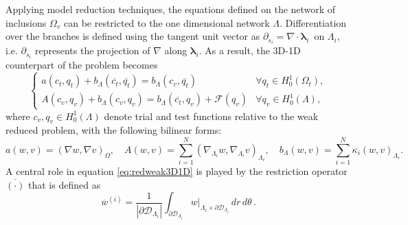 \documentclass[10pt]{article} %
\def\bct{\overline{c_t}}
\def\bqt{\overline{q_t}}
\begin{document}
	Applying model reduction techniques, the equations defined on the network of inclusions $\Omega_v$ can be restricted to the one dimensional network $\Lambda$. Differentiation over the branches is defined using the tangent unit vector as ${\partial_{s_i}} = \nabla \cdot \pmb{\lambda}_i\,$ on $ \Lambda_i$, i.e. ${\partial_{s_i}}$ represents the projection of $\nabla$ along $\boldsymbol \lambda_i$. \newline	
	As a result, the 3D-1D counterpart of the problem becomes
	\begin{equation}\label{eq:redweak3D1D}
	\begin{cases}
	a(c_t,q_t) + b_\Lambda(\bct,\bqt) = b_\Lambda(c_v,\bqt) & \forall q_t \in H^1_0(\Omega_t),
	\\
	A(c_v,q_v) + b_\Lambda(c_v,q_v) = b_\Lambda(\bct,q_v) + \mathcal{F} (q_v) & \forall q_v \in H^1_0(\Lambda),
	\end{cases}
	\end{equation}
	where $c_v,q_v \in H^1_0(\Lambda)$ denote trial and test functions relative to the weak reduced problem, with the following bilinear forms:
	\begin{equation*}
	a(w,v) = (\nabla w,\nabla v)_{\Omega}, 
	\quad
	A(w,v) = \sum_{i=1}^N (\nabla_{\Lambda_i} w, \nabla_{\Lambda_i} v)_{\Lambda_i}, 
	\quad 
	b_\Lambda(w,v) = \sum_{i=1}^N \kappa_i (w,v)_{\Lambda_i}.
	\end{equation*}
	A central role in equation \eqref{eq:redweak3D1D} is played by the restriction operator $\overline{(\cdot)}$ that is defined as
	\begin{equation*}
	\overline{w}^{(i)} = 
	\frac{1}{|\partial\mathcal{D}_{\Lambda_i}|} \int_{\partial\mathcal{D}_{\Lambda_i}} w|_{\Lambda_i \times \partial\mathcal{D}_{\Lambda_i}}\,dr\,d\theta\,.
	\end{equation*}
	
\end{document}

